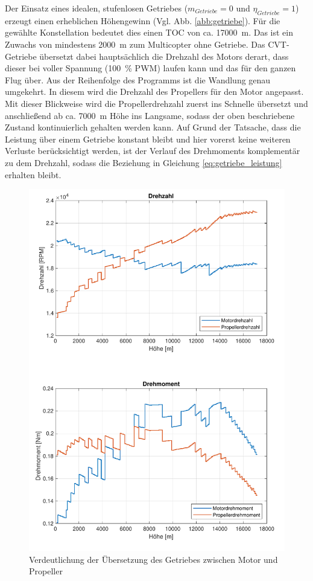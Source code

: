 Der Einsatz eines idealen, stufenlosen Getriebes (\ensuremath{m_{Getriebe} = 0} und \ensuremath{\eta_{Getriebe} = 1}) erzeugt einen erheblichen Höhengewinn (Vgl. Abb. \ref{abb:getriebe}). Für die gewählte Konstellation bedeutet dies einen TOC von ca. \SI{17000}{m}. Das ist ein Zuwachs von mindestens \SI{2000}{m} zum Multicopter ohne Getriebe. Das CVT-Getriebe übersetzt dabei hauptsächlich die Drehzahl des Motors derart, dass dieser bei voller Spannung (\SI{100}{\%} PWM) laufen kann und das für den ganzen Flug über. Aus der Reihenfolge des Programms ist die Wandlung genau umgekehrt. In diesem wird die Drehzahl des Propellers für den Motor angepasst. Mit dieser Blickweise wird die Propellerdrehzahl zuerst ins Schnelle übersetzt und anschließend ab ca. \SI{7000}{m} Höhe ins Langsame, sodass der oben beschriebene Zustand kontinuierlich gehalten werden kann. Auf Grund der Tatsache, dass die Leistung über einem Getriebe konstant bleibt und hier vorerst keine weiteren Verluste berücksichtigt werden, ist der Verlauf des Drehmoments komplementär zu dem Drehzahl, sodass die Beziehung in Gleichung \ref{eq:getriebe_leistung} erhalten bleibt.

\begin{figure}[H]
\centering
	\includegraphics[scale=0.5]{Diagramme/Drehzahl_und_Drehmoment.pdf}
	\caption{Verdeutlichung der Übersetzung des Getriebes zwischen Motor und Propeller}
	\label{abb:getriebe_dud}
\end{figure}

